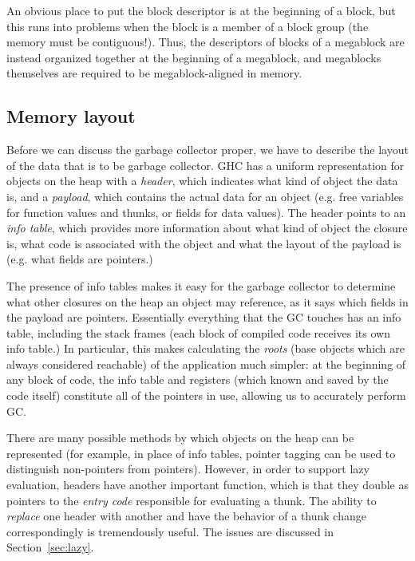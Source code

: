An obvious place to put the block descriptor is at the beginning of a
block, but this runs into problems when the block is a member of a
block group (the memory must be contiguous!).  Thus, the descriptors
of blocks of a megablock are instead organized together at the
beginning of a megablock, and megablocks themselves are required to be
megablock-aligned in memory.

\subsection{Memory layout}

Before we can discuss the garbage collector proper, we have to describe
the layout of the data that is to be garbage collector.  GHC has a uniform
representation for objects on the heap with a \emph{header}, which indicates
what kind of object the data is, and a \emph{payload}, which contains
the actual data for an object (e.g. free variables for function values
and thunks, or fields for data values).  The header points to an
\emph{info table}, which provides more information about what kind of
object the closure is, what code is associated with the object and what
the layout of the payload is (e.g. what fields are pointers.)

The presence of info tables makes it easy for the garbage collector to
determine what other closures on the heap an object may reference, as it
says which fields in the payload are pointers.  Essentially everything
that the GC touches has an info table, including the stack frames (each
block of compiled code receives its own info table.)  In particular,
this makes calculating the \emph{roots} (base objects which are always
considered reachable) of the application much simpler: at the beginning
of any block of code, the info table and registers (which known and
saved by the code itself) constitute all of the pointers in use,
allowing us to accurately perform GC.

There are many possible methods by which objects on the heap can be
represented (for example, in place of info tables, pointer tagging can
be used to distinguish non-pointers from pointers).  However, in order
to support lazy evaluation, headers have
another important function, which is that they double as pointers to the
\emph{entry code} responsible for evaluating a thunk.  The ability to \emph{replace}
one header with another and have the behavior of a thunk change
correspondingly is tremendously useful.  The issues are discussed in Section~\ref{sec:lazy}.

